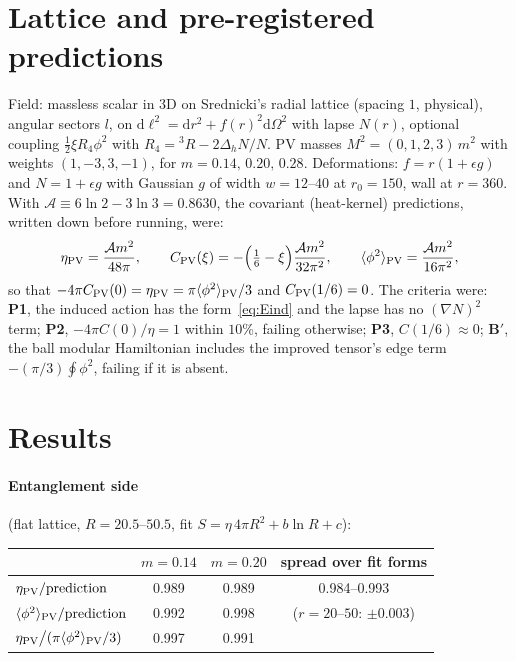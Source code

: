 \documentclass[11pt]{article}
\newcommand{\dd}{\mathrm{d}}
\begin{document}
\section{Lattice and pre-registered predictions}
Field: massless scalar in 3D on Srednicki's radial lattice (spacing $1$, physical), angular sectors $l$, on $\dd\ell^2=\dd r^2+f(r)^2\dd\Omega^2$ with lapse $N(r)$, optional coupling $\tfrac12\xi R_4\phi^2$ with $R_4={}^3\!R-2\Delta_hN/N$. PV masses $M^2=(0,1,2,3)\,m^2$ with weights $(1,-3,3,-1)$, for $m=0.14,\,0.20,\,0.28$. Deformations: $f=r(1+\epsilon g)$ and $N=1+\epsilon g$ with Gaussian $g$ of width $w=12$--$40$ at $r_0=150$, wall at $r=360$. With $\mathcal A\equiv6\ln2-3\ln3=0.8630$, the covariant (heat-kernel) predictions, written down before running, were:
\begin{equation}
\eta_{\rm PV}=\frac{\mathcal A m^2}{48\pi},\qquad C_{\rm PV}(\xi)=-\Big(\tfrac16-\xi\Big)\frac{\mathcal A m^2}{32\pi^2},\qquad \langle\phi^2\rangle_{\rm PV}=\frac{\mathcal A m^2}{16\pi^2},
\end{equation}
so that $-4\pi C_{\rm PV}(0)=\eta_{\rm PV}=\pi\langle\phi^2\rangle_{\rm PV}/3$ and $C_{\rm PV}(1/6)=0$. The criteria were: \textbf{P1}, the induced action has the form~\eqref{eq:Eind} and the lapse has no $(\nabla N)^2$ term; \textbf{P2}, $-4\pi C(0)/\eta=1$ within $10\%$, failing otherwise; \textbf{P3}, $C(1/6)\approx0$; \textbf{B$'$}, the ball modular Hamiltonian includes the improved tensor's edge term $-(\pi/3)\oint\phi^2$, failing if it is absent.

\section{Results}
\paragraph{Entanglement side} (flat lattice, $R=20.5$--$50.5$, fit $S=\eta\,4\pi R^2+b\ln R+c$):
\begin{center}\small\begin{tabular}{lccc}\toprule
& $m=0.14$ & $m=0.20$ & spread over fit forms\\\midrule
$\eta_{\rm PV}/{\rm prediction}$ & 0.989 & 0.989 & 0.984--0.993\\
$\langle\phi^2\rangle_{\rm PV}/{\rm prediction}$ & 0.992 & 0.998 & ($r=20$--$50$: $\pm0.003$)\\
$\eta_{\rm PV}\big/(\pi\langle\phi^2\rangle_{\rm PV}/3)$ & 0.997 & 0.991 & \\\bottomrule\end{tabular}\end{center}
\end{document}
